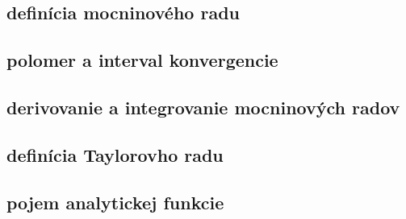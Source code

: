 \subsection{definícia mocninového radu}
\subsection{polomer a interval konvergencie}
\subsection{derivovanie a integrovanie mocninových radov}
\subsection{definícia Taylorovho radu}
\subsection{pojem analytickej funkcie}


